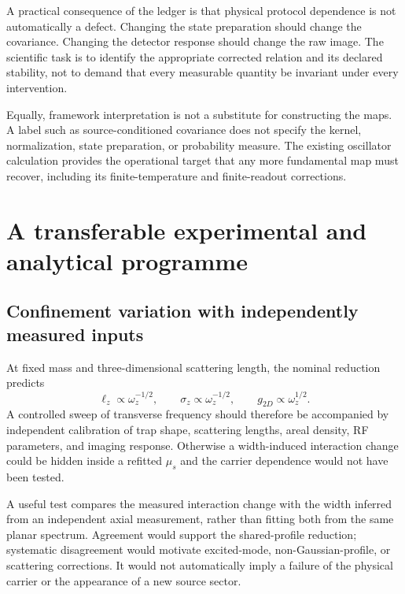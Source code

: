 \documentclass[11pt,a4paper]{article}
\theoremstyle{definition}
\theoremstyle{remark}
\newcommand{\lop}{\ell_z}
\begin{document}
A practical consequence of the ledger is that physical protocol dependence is not automatically a defect. Changing the state preparation should change the covariance. Changing the detector response should change the raw image. The scientific task is to identify the appropriate corrected relation and its declared stability, not to demand that every measurable quantity be invariant under every intervention.

Equally, framework interpretation is not a substitute for constructing the maps. A label such as source-conditioned covariance does not specify the kernel, normalization, state preparation, or probability measure. The existing oscillator calculation provides the operational target that any more fundamental map must recover, including its finite-temperature and finite-readout corrections.\cite{foundation,zhang2026}

\section{A transferable experimental and analytical programme}
\label{sec:tests}
\subsection{Confinement variation with independently measured inputs}
At fixed mass and three-dimensional scattering length, the nominal reduction predicts
\begin{equation}
 \lop\propto\omega_z^{-1/2},\qquad
 \sigma_z\propto\omega_z^{-1/2},\qquad
 g_{2D}\propto\omega_z^{1/2}.
 \label{eq:confinement_prediction}
\end{equation}
A controlled sweep of transverse frequency should therefore be accompanied by independent calibration of trap shape, scattering lengths, areal density, RF parameters, and imaging response. Otherwise a width-induced interaction change could be hidden inside a refitted $\mu_s$ and the carrier dependence would not have been tested.

A useful test compares the measured interaction change with the width inferred from an independent axial measurement, rather than fitting both from the same planar spectrum. Agreement would support the shared-profile reduction; systematic disagreement would motivate excited-mode, non-Gaussian-profile, or scattering corrections. It would not automatically imply a failure of the physical carrier or the appearance of a new source sector.
\end{document}
